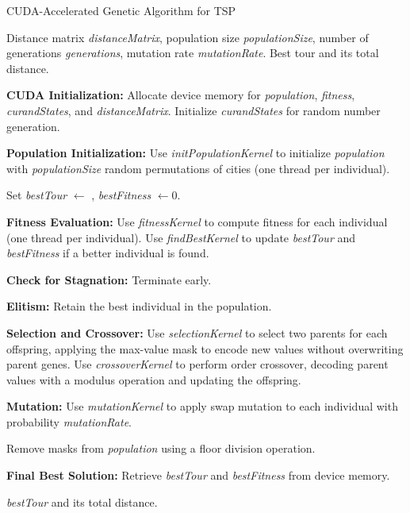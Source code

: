 \documentclass[conference]{IEEEtran}
\begin{document}
\begin{algorithm}
    \caption{CUDA-Accelerated Genetic Algorithm for TSP}
    \label{alg:cuda_genetic_algorithm}
    \begin{algorithmic}[1]
        \REQUIRE Distance matrix \textit{distanceMatrix}, population size \textit{populationSize}, number of generations \textit{generations}, mutation rate \textit{mutationRate}.
        \ENSURE Best tour and its total distance.

        \STATE \textbf{CUDA Initialization:}
        \STATE Allocate device memory for \textit{population}, \textit{fitness}, \textit{curandStates}, and \textit{distanceMatrix}.
        \STATE Initialize \textit{curandStates} for random number generation.

        \STATE \textbf{Population Initialization:}
        \STATE Use \textit{initPopulationKernel} to initialize \textit{population} with \textit{populationSize} random permutations of cities (one thread per individual).

        \STATE Set \textit{bestTour} $\leftarrow$ , \textit{bestFitness} $\leftarrow 0$.

        \STATE \textbf{Fitness Evaluation:}
        \STATE Use \textit{fitnessKernel} to compute fitness for each individual (one thread per individual).
        \STATE Use \textit{findBestKernel} to update \textit{bestTour} and \textit{bestFitness} if a better individual is found.

        \STATE \textbf{Check for Stagnation:}
        \STATE Terminate early.
        \ENDIF

        \STATE \textbf{Elitism:} Retain the best individual in the population.

        \STATE \textbf{Selection and Crossover:}
        \STATE Use \textit{selectionKernel} to select two parents for each offspring, applying the max-value mask to encode new values without overwriting parent genes.
        \STATE Use \textit{crossoverKernel} to perform order crossover, decoding parent values with a modulus operation and updating the offspring.

        \STATE \textbf{Mutation:}
        \STATE Use \textit{mutationKernel} to apply swap mutation to each individual with probability \textit{mutationRate}.

        \STATE Remove masks from \textit{population} using a floor division operation.
        \ENDFOR

        \STATE \textbf{Final Best Solution:}
        \STATE Retrieve \textit{bestTour} and \textit{bestFitness} from device memory.

        \RETURN \textit{bestTour} and its total distance.
    \end{algorithmic}
\end{algorithm}
\end{document}
